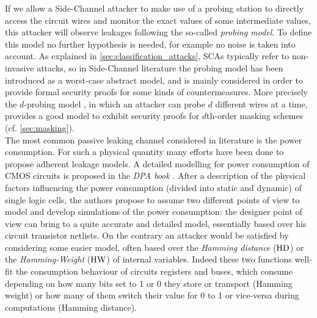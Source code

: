 If we allow a Side-Channel attacker to make use of a probing station to directly access the circuit wires and monitor the exact values of some intermediate values, this attacker will observe leakages following the so-called \emph{probing model}. To define this model no further hypothesis is needed, for example no noise is taken into account. As explained in \ref{sec:classification_attacks}, SCAs typically refer to non-invasive attacks, so in Side-Channel literature the probing model has been introduced as a worst-case abstract model, and is mainly considered in order to provide formal security proofs for some kinds of countermeasures. More precisely the $d$-probing model \cite{ishai2003private}, in which an attacker can probe $d$ different wires at a time, provides a good model to exhibit security proofs for $d$th-order masking schemes (cf. \ref{sec:masking}). \\
The most common passive leaking channel considered in literature is the power consumption. For such a physical quantity many efforts have been done to propose adherent leakage models. A detailed modelling for power consumption of CMOS circuits is proposed in the \emph{DPA book} \cite{mangard2008power}. After a description of the physical factors influencing the power consumption (divided into static and dynamic) of single logic cells, the authors propose to assume two different points of view to model and develop simulations of the power consumption: the designer point of view can bring to a quite accurate and detailed model, essentially based over his circuit transistor netlists. On the contrary an attacker would be satisfied by considering some easier model, often based over the \emph{Hamming distance} ($\mathrm{HD}$) or the \emph{Hamming-Weight} ($\mathrm{HW}$) of internal variables. Indeed these two functions well-fit the consumption behaviour of circuits registers and buses, which consume depending on how many bits set to 1 or 0 they store or transport (Hamming weight) or how many of them switch their value for 0 to 1 or vice-versa during computations (Hamming distance). \\
